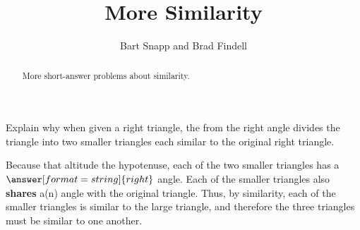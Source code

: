 \documentclass[nooutcomes]{ximera}
\title{More Similarity}
\author{Bart Snapp and Brad Findell}
\begin{document}
\begin{abstract}
More short-answer problems about similarity. 
\end{abstract}
\maketitle



\begin{question}
Explain why when given a right triangle, the 
from the right angle divides the triangle into two smaller triangles each
  similar to the original right triangle.
\begin{question}
Because that altitude  the hypotenuse, each of the two smaller triangles has a 
$\answer[format=string]{right}$ angle. Each of the smaller triangles also \textbf{shares} a(n) 
angle with the original triangle.  Thus, by 
similarity, each of the smaller triangles is similar to the large triangle, and therefore the three triangles must be similar to one another.  
\end{question}
\end{question}

\end{document}
